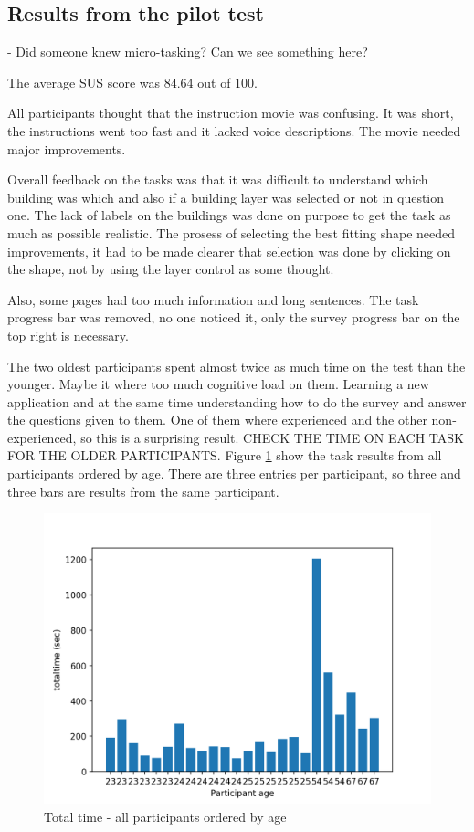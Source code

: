\subsection{Results from the pilot test}

- Did someone knew micro-tasking? Can we see something here?

The average SUS score was 84.64 out of 100. 

All participants thought that the instruction movie was confusing. It was short, the instructions went too fast and it lacked voice descriptions. The movie needed major improvements. 

Overall feedback on the tasks was that it was difficult to understand which building was which and also if a building layer was selected or not in question one. The lack of labels on the buildings was done on purpose to get the task as much as possible realistic. The prosess of selecting the best fitting shape needed improvements, it had to be made clearer that selection was done by clicking on the shape, not by using the layer control as some thought. 
 
Also, some pages had too much information and long sentences. The task progress bar was removed, no one noticed it, only the survey progress bar on the top right is necessary. 

The two oldest participants spent almost twice as much time on the test than the younger. Maybe it where too much cognitive load on them. Learning a new application and at the same time understanding how to do the survey and answer the questions given to them. One of them where experienced and the other non-experienced, so this is a surprising result.  CHECK THE TIME ON EACH TASK FOR THE OLDER PARTICIPANTS. Figure \ref{fig:allparticipantssortedageparticipantexclude4labelage} show the task results from all participants ordered by age. There are three entries per participant, so three and three bars are results from the same participant. \newline

\begin{figure}[h]
	\centering
	\includegraphics[width=0.8\linewidth]{fig/allParticipants_sorted_Age_Participant_exclude4_labelage}
	\caption[totaltimeage]{Total time - all participants ordered by age}
	\label{fig:allparticipantssortedageparticipantexclude4labelage}
\end{figure}

